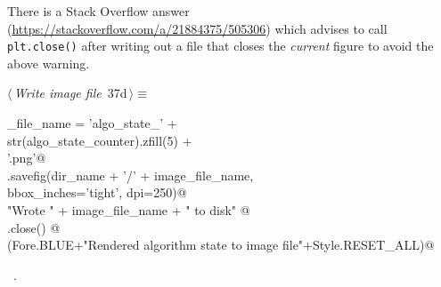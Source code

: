 \documentclass[11.5pt]{report}
\begin{document}
There is a  Stack Overflow answer (\url{https://stackoverflow.com/a/21884375/505306}) 
which advises to call \verb|plt.close()| after writing out a file that closes the 
\textit{current} figure to avoid the above warning. 
\begin{flushleft} \small\label{scrap50}\raggedright\small
{} $\langle\,${\itshape Write image file}\nobreak\ {\footnotesize {37d}}$\,\rangle\equiv$
\vspace{-1ex}
\begin{list}{}{} \item
\mbox{}\verb@image_file_name = 'algo_state_'                    +\@\\
\mbox{}\verb@                  str(algo_state_counter).zfill(5) +\@\\
\mbox{}\verb@                     '.png'@\\
\mbox{}\verb@plt.savefig(dir_name + '/' + image_file_name,  \@\\
\mbox{}\verb@            bbox_inches='tight', dpi=250)@\\
\mbox{}\verb@print "Wrote " + image_file_name + " to disk"   @\\
\mbox{}\verb@plt.close() @\\
\mbox{}\verb@debug(Fore.BLUE+"Rendered algorithm state to image file"+Style.RESET_ALL)@\\
\mbox{}\verb@@{\NWsep}
\end{list}
\vspace{-1.5ex}
\footnotesize
\begin{list}{}{\setlength{\itemsep}{-\parsep}\setlength{\itemindent}{-\leftmargin}}
\item \NWtxtMacroRefIn\ .

\item{}
\end{list}
\vspace{4ex}
\end{flushleft}
\end{document}
